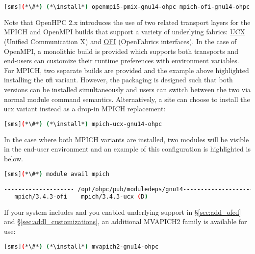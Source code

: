 \fi

\begin{lstlisting}[language=bash]
[sms](*\#*) (*\install*) openmpi5-pmix-gnu14-ohpc mpich-ofi-gnu14-ohpc
\end{lstlisting}

Note that OpenHPC 2.x introduces the use of two related transport layers for
the MPICH and OpenMPI builds that support a variety of underlying
fabrics: \href{https://www.openucx.org}{UCX} (Unified Communication X)
and \href{https://ofiwg.github.io/libfabric/}{OFI} (OpenFabrics interfaces).
In the case of OpenMPI, a monolithic build is provided which supports both
transports and end-users can customize their runtime preferences with
environment variables. For MPICH, two separate builds are provided and the
example above highlighted installing the {\texttt ofi} variant.  However, the
packaging is designed such that both versions can be installed simultaneously
and users can switch between the two via normal module command
semantics. Alternatively, a site can choose to install the {\texttt ucx} variant
instead as a drop-in MPICH replacement:

\begin{lstlisting}[language=bash]
[sms](*\#*) (*\install*) mpich-ucx-gnu14-ohpc
\end{lstlisting}

In the case where both MPICH variants are installed, two modules will be
visible in the end-user environment and an example of this configuration is
highlighted is below.

\begin{lstlisting}[language=bash]
[sms](*\#*) module avail mpich

-------------------- /opt/ohpc/pub/moduledeps/gnu14---------------------
   mpich/3.4.3-ofi    mpich/3.4.3-ucx (D)
\end{lstlisting}

If your system includes \InfiniBand{} and you enabled underlying support in
\S\ref{sec:add_ofed} and \S\ref{sec:addl_customizations}, an additional
MVAPICH2 family is available for use:

\begin{lstlisting}[language=bash]
[sms](*\#*) (*\install*) mvapich2-gnu14-ohpc
\end{lstlisting}

